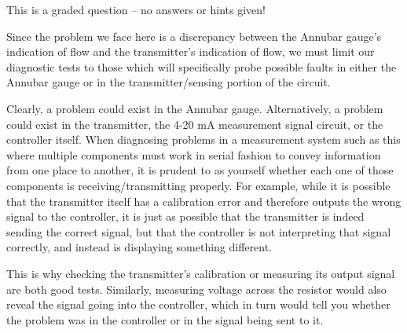\vfil 

\eject






This is a graded question -- no answers or hints given!







Since the problem we face here is a discrepancy between the Annubar gauge's indication of flow and the transmitter's indication of flow, we must limit our diagnostic tests to those which will specifically probe possible faults in either the Annubar gauge or in the transmitter/sensing portion of the circuit.

\vskip 10pt

Clearly, a problem could exist in the Annubar gauge.  Alternatively, a problem could exist in the transmitter, the 4-20 mA measurement signal circuit, or the controller itself.  When diagnosing problems in a measurement system such as this where multiple components must work in serial fashion to convey information from one place to another, it is prudent to as yourself whether each one of those components is receiving/transmitting properly.  For example, while it is possible that the transmitter itself has a calibration error and therefore outputs the wrong signal to the controller, it is just as possible that the transmitter is indeed sending the correct signal, but that the controller is not interpreting that signal correctly, and instead is displaying something different.

\vskip 10pt

This is why checking the transmitter's calibration or measuring its output signal are both good tests.  Similarly, measuring voltage across the resistor would also reveal the signal going into the controller, which in turn would tell you whether the problem was in the controller or in the signal being sent to it.


